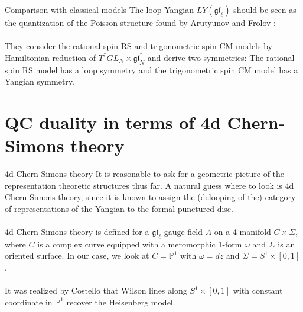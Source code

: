 \documentclass[11pt]{beamer}
\theoremstyle{remark}
\theoremstyle{remark}
\renewcommand{\P}{\mathbb{P}}
\begin{document}
\begin{frame}{Comparison with classical models}
The loop Yangian $LY(\mathfrak{gl}_\ell)$ should be seen as the quantization of the Poisson structure found by Arutyunov and Frolov \cite{article:arutyunov:1998}:
\\~\\
They consider the rational spin RS and trigonometric spin CM models by Hamiltonian reduction of $T^* GL_N \times \mathfrak{gl}_N^*$ and derive two symmetries: The rational spin RS model has a loop symmetry and the trigonometric spin CM model has a Yangian symmetry.
\end{frame}

\section{QC duality in terms of 4d Chern-Simons theory}

\begin{frame}{4d Chern-Simons theory}
It is reasonable to ask for a geometric picture of the representation theoretic structures thus far. A natural guess where to look is 4d Chern-Simons theory, since it is known to assign the (delooping of the) category of representations of the Yangian to the formal punctured disc.
\\~\\
4d Chern-Simons theory is defined for a $\mathfrak{gl}_\ell$-gauge field $A$ on a 4-manifold $C \times \Sigma$, where $C$ is a complex curve equipped with a meromorphic 1-form $\omega$ and $\Sigma$ is an oriented surface. In our case, we look at $C = \P^1$ with $\omega = dz$ and $\Sigma = S^1 \times [0,1]$.
\\~\\
It was realized by Costello \cite{article:costello:2013} that Wilson lines along $S^1 \times [0,1]$ with constant coordinate in $\P^1$ recover the Heisenberg model.
\end{frame}
\end{document}
